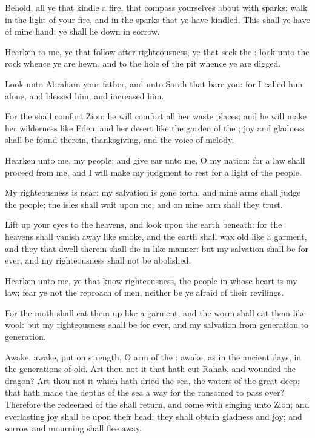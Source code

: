 \Verse Behold, all ye that kindle a fire, that compass yourselves about with sparks: walk in the light of your fire, and in the sparks that ye have kindled. This shall ye have of mine hand; ye shall lie down in sorrow.


\Chapter
\Verse Hearken to me, ye that follow after righteousness, ye that seek the \LORD: look unto the rock whence ye are hewn, and to the hole of the pit whence ye are digged.

\Verse Look unto Abraham your father, and unto Sarah that bare you: for I called him alone, and blessed him, and increased him.

\Verse For the \LORD shall comfort Zion: he will comfort all her waste places; and he will make her wilderness like Eden, and her desert like the garden of the \LORD; joy and gladness shall be found therein, thanksgiving, and the voice of melody.

\Verse Hearken unto me, my people; and give ear unto me, O my nation: for a law shall proceed from me, and I will make my judgment to rest for a light of the people.

\Verse My righteousness is near; my salvation is gone forth, and mine arms shall judge the people; the isles shall wait upon me, and on mine arm shall they trust.

\Verse Lift up your eyes to the heavens, and look upon the earth beneath: for the heavens shall vanish away like smoke, and the earth shall wax old like a garment, and they that dwell therein shall die in like manner: but my salvation shall be for ever, and my righteousness shall not be abolished.

\Verse Hearken unto me, ye that know righteousness, the people in whose heart is my law; fear ye not the reproach of men, neither be ye afraid of their revilings.

\Verse For the moth shall eat them up like a garment, and the worm shall eat them like wool: but my righteousness shall be for ever, and my salvation from generation to generation.

\Verse Awake, awake, put on strength, O arm of the \LORD; awake, as in the ancient days, in the generations of old. Art thou not it that hath cut Rahab, and wounded the dragon?  \Verse Art thou not it which hath dried the sea, the waters of the great deep; that hath made the depths of the sea a way for the ransomed to pass over?  \Verse Therefore the redeemed of the \LORD shall return, and come with singing unto Zion; and everlasting joy shall be upon their head: they shall obtain gladness and joy; and sorrow and mourning shall flee away.

